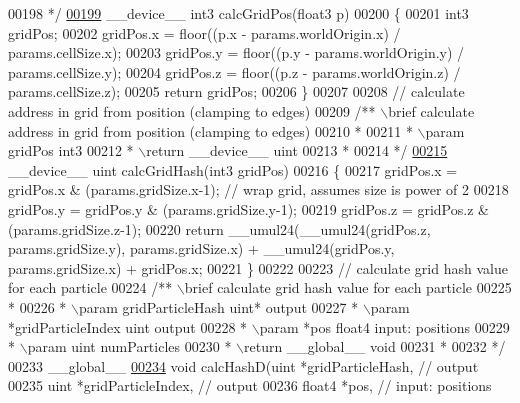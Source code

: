 \begin{DoxyCode}
00198 \textcolor{comment}{ */}
\hypertarget{particles__kernel__impl_8cuh_source_l00199}{}\hyperlink{particles__kernel__impl_8cuh_a63d62750e6cbb8781c5ff252fc13c1fd}{00199} \_\_device\_\_ int3 calcGridPos(float3 p)
00200 \{
00201     int3 gridPos;
00202     gridPos.x = floor((p.x - params.worldOrigin.x) / params.cellSize.x);
00203     gridPos.y = floor((p.y - params.worldOrigin.y) / params.cellSize.y);
00204     gridPos.z = floor((p.z - params.worldOrigin.z) / params.cellSize.z);
00205     \textcolor{keywordflow}{return} gridPos;
00206 \}
00207 
00208 \textcolor{comment}{// calculate address in grid from position (clamping to edges)}
00209 \textcolor{comment}{/** \(\backslash\)brief calculate address in grid from position (clamping to edges)}
00210 \textcolor{comment}{ *}
00211 \textcolor{comment}{ * \(\backslash\)param gridPos int3}
00212 \textcolor{comment}{ * \(\backslash\)return \_\_device\_\_ uint}
00213 \textcolor{comment}{ *}
00214 \textcolor{comment}{ */}
\hypertarget{particles__kernel__impl_8cuh_source_l00215}{}\hyperlink{particles__kernel__impl_8cuh_ad20ac253847311c176aacf9a224e14e5}{00215} \_\_device\_\_ uint calcGridHash(int3 gridPos)
00216 \{
00217     gridPos.x = gridPos.x & (params.gridSize.x-1);  \textcolor{comment}{// wrap grid, assumes size is power of 2}
00218     gridPos.y = gridPos.y & (params.gridSize.y-1);
00219     gridPos.z = gridPos.z & (params.gridSize.z-1);
00220     \textcolor{keywordflow}{return} \_\_umul24(\_\_umul24(gridPos.z, params.gridSize.y), params.gridSize.x) + \_\_umul24(gridPos.y, 
      params.gridSize.x) + gridPos.x;
00221 \}
00222 
00223 \textcolor{comment}{// calculate grid hash value for each particle}
00224 \textcolor{comment}{/** \(\backslash\)brief calculate grid hash value for each particle}
00225 \textcolor{comment}{ *}
00226 \textcolor{comment}{ * \(\backslash\)param gridParticleHash uint* output}
00227 \textcolor{comment}{ * \(\backslash\)param *gridParticleIndex uint output}
00228 \textcolor{comment}{ * \(\backslash\)param *pos float4 input: positions}
00229 \textcolor{comment}{ * \(\backslash\)param  uint    numParticles}
00230 \textcolor{comment}{ * \(\backslash\)return \_\_global\_\_ void}
00231 \textcolor{comment}{ *}
00232 \textcolor{comment}{ */}
00233 \_\_global\_\_
\hypertarget{particles__kernel__impl_8cuh_source_l00234}{}\hyperlink{particles__kernel__impl_8cuh_a4c688195fb1c2963cbdcaf62c737b9d7}{00234} \textcolor{keywordtype}{void} calcHashD(uint   *gridParticleHash,  \textcolor{comment}{// output}
00235                uint   *gridParticleIndex, \textcolor{comment}{// output}
00236                float4 *pos,               \textcolor{comment}{// input: positions}

\end{DoxyCode}
